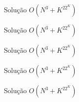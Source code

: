 \begin{frame}[fragile]{Solução $O(N^3 + K^22^K)$}
\end{frame}

\begin{frame}[fragile]{Solução $O(N^3 + K^22^K)$}
\end{frame}

\begin{frame}[fragile]{Solução $O(N^3 + K^22^K)$}
\end{frame}

\begin{frame}[fragile]{Solução $O(N^3 + K^22^K)$}
\end{frame}

\begin{frame}[fragile]{Solução $O(N^3 + K^22^K)$}
\end{frame}
